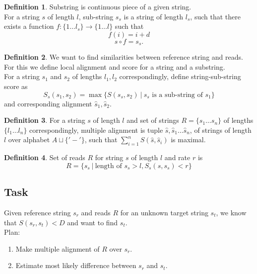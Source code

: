 \documentclass[a4paper, 12pt]{article}
\theoremstyle{definition}
\newtheorem{definition}{Definition}[section]
\theoremstyle{definition}
\theoremstyle{remark}
\begin{document}
\begin{definition}
    Substring is continuous piece of a given string.\\
    For a string $s$ of length $l$, sub-string $s_s$ 
    is a string of length $l_s$, such that there exists a function
    $f: \{ 1 \ldots l_s \} \rightarrow \{ 1 \ldots l\}$
    such that
    $$ f(i) = i + d $$
    $$s \circ f = s_s.$$
\end{definition}

\begin{definition}
    We want to find similarities between reference string and reads. 
    For this we define local alignment and score for a string and a substring. \\  
    For a string $s_1$ and $s_2$ of lengths $l_1, l_2$ correspondingly, define string-sub-string score as 
    $$ S_s (s_1, s_2) = \max \{ S(s_s, s_2) \:|\: s_s \text{ is a sub-string of } s_1 \}$$
    and corresponding alignment $\hat{s}_1, \hat{s}_2$.
\end{definition}

\begin{definition}
    For a string $s$ of length $l$ and set of strings $R = \{ s_1 \ldots s_n \}$ 
    of lengths $\{ l_1 \ldots l_n \}$ correspondingly, 
    multiple alignment is tuple $\hat{s}, \hat{s}_1 \ldots \hat{s}_n$, 
    of strings of length $l$ over alphabet $A \sqcup \{ '-' \}$, such that $\sum_{i = 1}^n S(\hat{s}, \hat{s}_i)$ is maximal.
\end{definition}

\begin{definition}
    Set of reads $R$ for string $s$ of length $l$ and rate $r$ is 
    $$ R = \{ s_s \:|\: \text{length of } s_s > l, S_s(s, s_s) < r \}$$
\end{definition}

\subsection{Task}
Given reference string $s_r$ and reads $R$ for an unknown target string $s_t$, 
we know that $S(s_r, s_t) < D$ and want to find $s_t$. \\

Plan:
\begin{enumerate}
    \item Make multiple alignment of $R$ over $s_r$.
    \item Estimate most likely difference between $s_r$ and $s_t$.
\end{enumerate}
\end{document}
